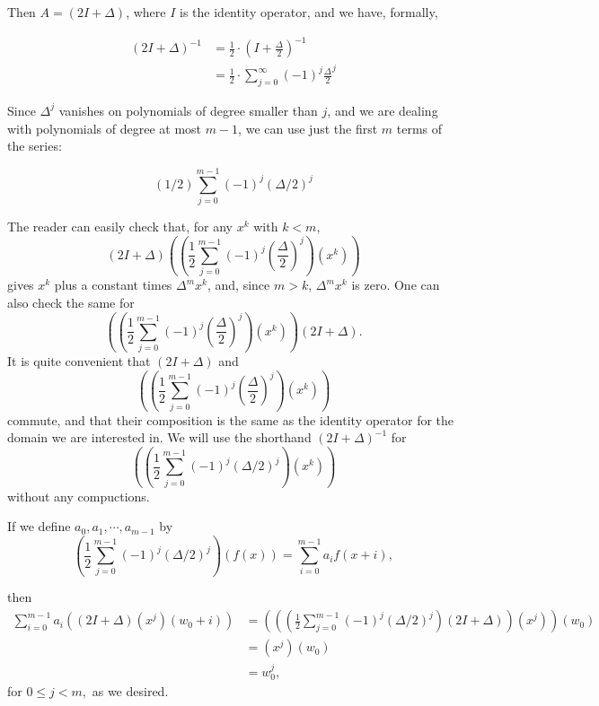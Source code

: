 \documentclass[10pt,reqno]{amsart}
\theoremstyle{plain}
\theoremstyle{definition}
\theoremstyle{remark}
\begin{document}
Then $A = (2I+\Delta)$, where $I$ is the identity operator, and we have,
formally,

\begin{equation}
\begin{aligned}
(2I+\Delta)^{-1} &= \frac{1}{2} \cdot (I+\frac{\Delta }{2})^{-1} \\
                 &= \frac{1}{2} \cdot \sum_{j=0}^\infty (-1)^j 
						\frac{\Delta }{2}^j
\end{aligned}
\end{equation}

Since $\Delta^j$ vanishes on polynomials of degree smaller than $j$,
and we are dealing with polynomials of degree at most $m-1$, we can use
just the first $m$ terms of the series:

\begin{equation}
(1/2) \sum_{j=0}^{m-1} (-1)^j (\Delta/2)^j
\end{equation}

The reader can easily check that, for any $x^k$ with $k<m$,
\begin{equation}
(2I+\Delta) ((\frac{1}{2} \sum_{j=0}^{m-1} (-1)^j 
			(\frac{\Delta}{2})^j) (x^k))
\end{equation}
gives $x^k$ plus  a constant times $\Delta^m x^k$, and, since $m>k$,
$\Delta^m x^k$ is zero. One can also check the same for
\begin{equation}
((\frac{1}{2} \sum_{j=0}^{m-1} (-1)^j (\frac{\Delta}{2})^j) 
						(x^k)) (2I+\Delta).
\end{equation}
It is quite convenient that $(2I+\Delta )$ and 
\begin{equation}
((\frac{1}{2}  \sum_{j=0}^{m-1} (-1)^j (\frac{\Delta}{2})^j) (x^k))
\end{equation}
commute, and that their composition is the same as the identity operator
for the domain we are interested in. We will use
the shorthand $(2I+\Delta)^{-1}$ for
\begin{equation}
((\frac{1}{2} \sum_{j=0}^{m-1} (-1)^j (\Delta/2)^j) (x^k))
\end{equation}
without any compuctions.

If we define $a_0,a_1,\dotsb, a_{m-1}$ by
\begin{equation}
(\frac{1}{2} \sum_{j=0}^{m-1} (-1)^j (\Delta/2)^j)(f(x)) = 
                                 \sum_{i=0}^{m-1} a_i f(x+i),
\end{equation}

then 
\begin{equation}
\begin{aligned}
\sum_{i=0}^{m-1} a_i ((2I+\Delta)(x^j)(w_0+i)) &=
     (((\frac{1}{2} 
        \sum_{j=0}^{m-1} (-1)^j (\Delta/2)^j)(2I+\Delta))(x^j))(w_0) \\
&= (x^j)(w_0) \\
&= w_0^j,
\end{aligned}
\end{equation}
for $0\leq j<m,$ as we desired.
\end{document}
